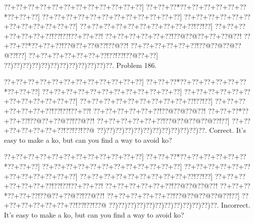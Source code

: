 \documentclass[a5paper]{article}
\begin{document}
\begin{center}
{\goo
\0??+\0??+\0??+\0??+\0??+\0??+\0??+\0??+\0??+\0??+\0??+\0??]
\0??+\0??+\0??*\0??+\0??+\0??+\0??+\0??+\0??*\0??+\0??+\0??]
\0??+\0??+\0??+\0??+\0??+\0??+\0??+\0??+\0??+\0??+\0??+\0??]
\0??+\0??+\0??+\0??+\0??+\0??+\0??+\0??+\0??+\0??+\0??+\0??]
\0??+\0??+\0??+\0??+\0??+\0??+\0??+\0??+\0??+\0??!\0??!\0??]
\0??+\0??+\0??+\0??+\0??+\0??+\0??!\0??!\0??!\0??+\0??+\0??!
\0??+\0??+\0??+\0??+\0??+\0??!\0??@\0??@\0??+\0??+\0??@\0??!
\0??+\0??+\0??*\0??+\0??+\0??!\0??@\0??+\0??@\0??!\0??@\0??!
\0??+\0??+\0??+\0??+\0??+\0??!\0??@\0??@\0??@\0??@\0??!\0??]
\0??+\0??+\0??+\0??+\0??+\0??+\0??!\0??!\0??!\0??@\0??+\0??]
\0??)\0??)\0??)\0??)\0??)\0??)\0??)\0??)\0??)\0??)\0??)\0??.
}
Problem 186.

\end{center}
\begin{center}
{\goo
\0??+\0??+\0??+\0??+\0??+\0??+\0??+\0??+\0??+\0??+\0??+\0??]
\0??+\0??+\0??*\0??+\0??+\0??+\0??+\0??+\0??*\0??+\0??+\0??]
\0??+\0??+\0??+\0??+\0??+\0??+\0??+\0??+\0??+\0??+\0??+\0??]
\0??+\0??+\0??+\0??+\0??+\0??+\0??+\0??+\0??+\0??+\0??+\0??]
\0??+\0??+\0??+\0??+\0??+\0??+\0??+\0??+\0??+\0??!\0??!\0??]
\0??+\0??+\0??+\0??+\0??+\0??+\0??!\0??!\0??!\0??+\0??!
\0??+\0??+\0??+\0??+\0??+\0??!\0??@\0??@\0??@\0??!
\0??+\0??+\0??*\0??+\0??+\0??!\0??@\0??+\0??@\0??!\0??@\0??!
\0??+\0??+\0??+\0??+\0??+\0??!\0??@\0??@\0??@\0??@\0??!\0??]
\0??+\0??+\0??+\0??+\0??+\0??+\0??!\0??!\0??!\0??@
\0??)\0??)\0??)\0??)\0??)\0??)\0??)\0??)\0??)\0??)\0??)\0??.
}
Correct. It's easy to make a ko, but can you find a way to avoid ko?

\end{center}
\begin{center}
{\goo
\0??+\0??+\0??+\0??+\0??+\0??+\0??+\0??+\0??+\0??+\0??+\0??]
\0??+\0??+\0??*\0??+\0??+\0??+\0??+\0??+\0??*\0??+\0??+\0??]
\0??+\0??+\0??+\0??+\0??+\0??+\0??+\0??+\0??+\0??+\0??+\0??]
\0??+\0??+\0??+\0??+\0??+\0??+\0??+\0??+\0??+\0??+\0??+\0??]
\0??+\0??+\0??+\0??+\0??+\0??+\0??+\0??+\0??+\0??!\0??!\0??]
\0??+\0??+\0??+\0??+\0??+\0??+\0??!\0??!\0??!\0??+\0??+\0??!
\0??+\0??+\0??+\0??+\0??+\0??!\0??@\0??@\0??@\0??!
\0??+\0??+\0??*\0??+\0??+\0??!\0??@\0??+\0??@\0??!\0??@\0??!
\0??+\0??+\0??+\0??+\0??+\0??!\0??@\0??@\0??@\0??@\0??!\0??]
\0??+\0??+\0??+\0??+\0??+\0??+\0??!\0??!\0??!\0??@
\0??)\0??)\0??)\0??)\0??)\0??)\0??)\0??)\0??)\0??)\0??)\0??.
}
Incorrect. It's easy to make a ko, but can you find a way to avoid ko?

\end{center}
\end{document}
